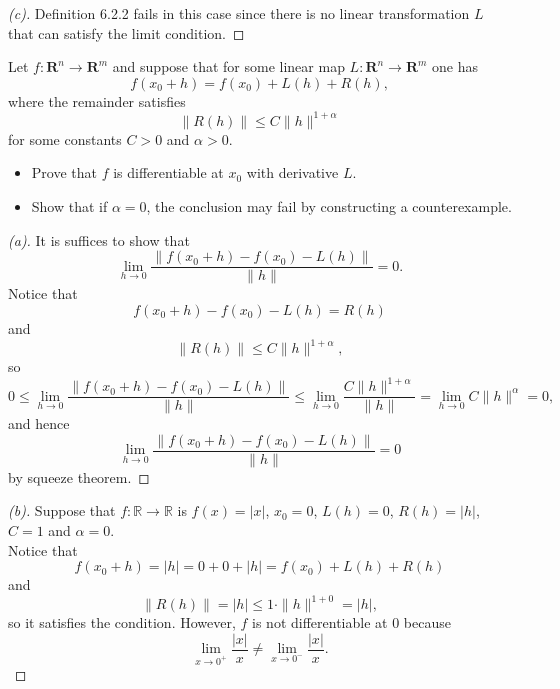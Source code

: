 \begin{proof}[(c)]
    Definition 6.2.2 fails in this case since there is no linear transformation $L$ that can satisfy the limit condition.
\end{proof}

\begin{problem}
    Let $f:\mathbf{R}^n\to\mathbf{R}^m$ and suppose that for some linear map
$L:\mathbf{R}^n\to\mathbf{R}^m$ one has
$$
f(x_0+h)=f(x_0)+L(h)+R(h),
$$
where the remainder satisfies
$$
\|R(h)\| \le C \|h\|^{1+\alpha}
$$
for some constants $C>0$ and $\alpha>0$.

\begin{itemize}
\item[(a)] Prove that $f$ is differentiable at $x_0$ with derivative $L$.

\item[(b)] Show that if $\alpha=0$, the conclusion may fail
by constructing a counterexample.
\end{itemize}
\end{problem}

\begin{proof}[(a)]
    It is suffices to show that 
    \[
        \lim_{h \to 0} \frac{\|f(x_0 + h) - f(x_0) - L(h)\|}{\| h\|} = 0.
    \]
    Notice that 
    \[
        f(x_0 + h) - f(x_0) - L(h) = R(h)
    \]
    and 
    \[
        \|R(h)\| \le C \|h\|^{1+\alpha},
    \]
    so
    \[
        0 \le \lim_{h \to 0} \frac{\|f(x_0 + h) - f(x_0) - L(h)\|}{\| h\|} \le \lim_{h \to 0} \frac{C\| h\|^{1+\alpha}}{\| h\|} = \lim_{h \to 0} C\| h\|^{\alpha} = 0,
    \]
    and hence
    \[
        \lim_{h \to 0} \frac{\|f(x_0 + h) - f(x_0) - L(h)\|}{\| h\|} = 0
    \]
    by squeeze theorem.
\end{proof}

\begin{proof}[(b)]
    Suppose that $f:\mathbb{R} \to \mathbb{R}$ is $f(x) = \lvert x \rvert$, $x_0 = 0$, $L(h) = 0$, $R(h) = \lvert h \rvert$, $C = 1$ and $\alpha = 0$. \\
    Notice that 
    \[
        f(x_0 + h) = \lvert h \rvert = 0 + 0 + \lvert h \rvert = f(x_0)+L(h)+R(h)
    \]
    and
    \[
        \|R(h)\| = \lvert h \rvert \le 1 \cdot \|h\|^{1+0} = \lvert h \rvert,
    \]
    so it satisfies the condition.
    However, $f$ is not differentiable at 0 because
    \[
        \lim_{x \to 0^+} \frac{\lvert x \rvert}{x} \ne \lim_{x \to 0^-} \frac{\lvert x \rvert}{x}.
    \]
\end{proof}

